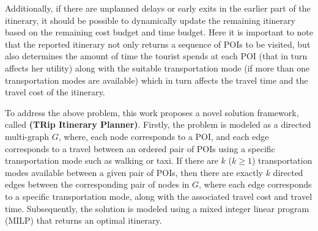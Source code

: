 Additionally, if there are unplanned delays or early exits in the earlier part of the itinerary, it should be possible to dynamically update the remaining itinerary based on the remaining cost budget and time budget. Here it is important to note that the reported itinerary not only returns a sequence of POIs to be visited, but also determines the amount of time the tourist spends at each POI (that in turn affects her utility) along with the suitable transportation mode (if more than one transportation modes are available) which in turn affects the travel time and the travel cost of the itinerary.

To address the above problem, this work proposes a novel solution framework,  called \textbf{\trip (TRip Itinerary Planner)}.  Firstly, the problem is modeled as a directed multi-graph $G$, where, each node corresponds to a POI, and each edge corresponds to a travel between an ordered pair of POIs using a specific transportation mode such as walking or taxi. If there are $k$ ($k \ge 1$) transportation modes available between a given pair of POIs, then there are exactly $k$ directed edges between the corresponding pair of nodes in $G$, where each edge corresponds to a specific transportation mode, along with the associated travel cost and travel time. Subsequently, the solution is modeled using a mixed integer linear program (MILP) that returns an optimal itinerary.

